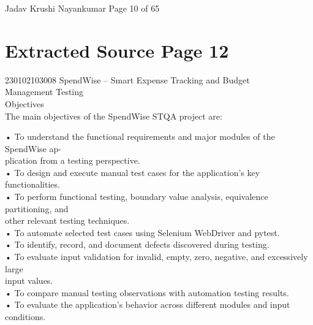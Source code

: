 \documentclass[12pt,a4paper]{report}
\begin{document}
\smallskip

\smallskip

\smallskip

\smallskip
Jadav Krushi Nayankumar                                                         Page 10 of 65\\ 

\clearpage
\section*{Extracted Source Page 12}
230102103008                         SpendWise – Smart Expense Tracking and Budget\\ 
Management Testing\\ 

 Objectives\\ 

\smallskip
The main objectives of the SpendWise STQA project are:\\ 

\smallskip

\smallskip
• To understand the functional requirements and major modules of the SpendWise ap-\\ 
plication from a testing perspective.\\ 

\smallskip
• To design and execute manual test cases for the application’s key functionalities.\\ 

\smallskip
• To perform functional testing, boundary value analysis, equivalence partitioning, and\\ 
other relevant testing techniques.\\ 

\smallskip
• To automate selected test cases using Selenium WebDriver and pytest.\\ 

\smallskip
• To identify, record, and document defects discovered during testing.\\ 

\smallskip
• To evaluate input validation for invalid, empty, zero, negative, and excessively large\\ 
input values.\\ 

\smallskip
• To compare manual testing observations with automation testing results.\\ 

\smallskip
• To evaluate the application’s behavior across different modules and input conditions.\\ 
\end{document}
